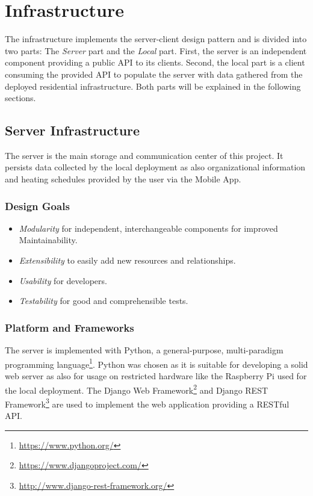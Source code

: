 
\chapter{Infrastructure}
\label{sec:infrastructure}

The infrastructure implements the server-client design pattern and is divided into two parts: The \emph{Server} part and the \emph{Local} part. First, the server is an independent component providing a public API to its clients. Second, the local part is a client consuming the provided API to populate the server with data gathered from the deployed residential infrastructure.
Both parts will be explained in the following sections.

\section{Server Infrastructure}
\label{sec:server_infrastructure}

The server is the main storage and communication center of this project. It persists data collected by the local deployment as also organizational information and heating schedules provided by the user via the Mobile App.

\subsection{Design Goals}

\begin{itemize}
\item \emph{Modularity} for independent, interchangeable components for improved Maintainability.
\item \emph{Extensibility} to easily add new resources and relationships.
\item \emph{Usability} for developers.
\item \emph{Testability} for good and comprehensible tests.
\end{itemize}

\subsection{Platform and Frameworks}

The server is implemented with Python, a general-purpose, multi-paradigm programming language\footnote{\url{https://www.python.org/}}. Python was chosen as it is suitable for developing a solid web server as also for usage on restricted hardware like the Raspberry Pi used for the local deployment. The Django Web Framework\footnote{\url{https://www.djangoproject.com/}} and Django REST Framework\footnote{\url{http://www.django-rest-framework.org/}} are used to implement the web application providing a RESTful API.

